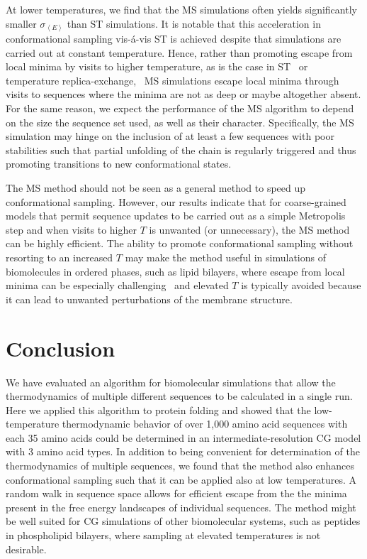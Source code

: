 \documentclass[
aip,
rsi,%
amsmath,amssymb,
reprint,%
]{revtex4-1}
\newcommand {\sigE}	{{\sigma_{\left < E \right >}}}
\begin{document}
At lower temperatures, we find that the MS simulations often yields significantly smaller $\sigE$ than ST simulations. It is notable that this acceleration in conformational sampling vis-{\'a}-vis ST is achieved despite that simulations are carried out at constant temperature. Hence, rather than promoting escape from local minima by visits to higher temperature, as is the case in  ST~\cite{Marinari1992,Lyubartsev1992} or temperature replica-exchange,~\cite{Swendsen1986}  MS simulations escape local minima through visits to sequences where the minima are not as deep or maybe altogether absent. For the same reason, we expect the performance of the MS algorithm to depend on the size the sequence set used, as well as their character.  Specifically, the MS simulation may hinge on the inclusion of at least a few sequences with poor stabilities such that partial unfolding of the chain is regularly triggered and thus promoting transitions to new conformational states. 

The MS method should not be seen as a general method to speed up conformational sampling. However, our results indicate that for coarse-grained models that permit sequence updates to be carried out as a simple Metropolis step and when visits to higher $T$ is unwanted (or unnecessary), the MS method can be highly efficient. The ability to promote conformational sampling without resorting to an increased $T$ may make the method useful in simulations of biomolecules in ordered phases, such as lipid bilayers, where escape from local minima can be especially challenging~\cite{Bereau2015} and elevated $T$ is typically avoided because it can lead to unwanted perturbations of the membrane structure.~\cite{Ulmschneider2010}  

\section{Conclusion}
\noindent
We have evaluated an algorithm for biomolecular simulations that allow the thermodynamics of multiple different sequences to be calculated in a single run. Here we applied this algorithm to protein folding and showed that the low-temperature thermodynamic behavior of over 1,000 amino acid sequences with each 35 amino acids could be determined in an intermediate-resolution CG model with 3 amino acid types. In addition to being convenient for determination of the thermodynamics of multiple sequences, we found that the method also enhances conformational sampling such that it can be applied also at low temperatures. A random walk in sequence space allows for efficient escape from the the minima present in the free energy landscapes of individual sequences. The method might be well suited for CG simulations of other biomolecular systems, such as peptides in phospholipid bilayers, where sampling at elevated temperatures is not desirable. 


\end{document}
